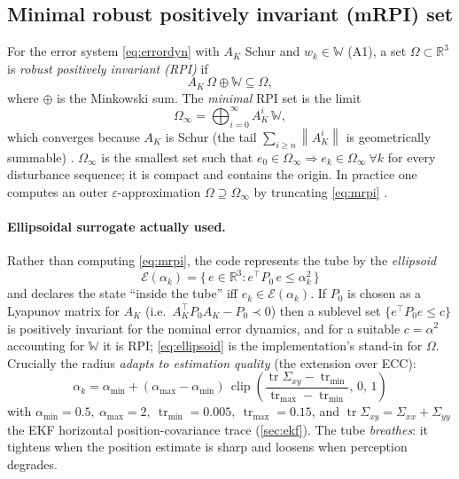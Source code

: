 \documentclass[11pt]{article}
\DeclareMathOperator{\tr}{tr}
\DeclareMathOperator{\clip}{clip}
\newcommand{\R}{\mathbb{R}}
\newcommand{\W}{\mathbb{W}}
\newcommand{\norm}[1]{\left\lVert #1 \right\rVert}
\begin{document}
\subsection{Minimal robust positively invariant (mRPI) set}
For the error system \cref{eq:errordyn} with $A_K$ Schur and $w_k\in\W$ (A1), a set $\Omega\subset\R^3$ is
\emph{robust positively invariant (RPI)} if
\begin{equation}
A_K\,\Omega \oplus \W \subseteq \Omega ,
\label{eq:rpi}
\end{equation}
where $\oplus$ is the Minkowski sum. The \emph{minimal} RPI set is the limit
\begin{equation}
\Omega_\infty = \bigoplus_{i=0}^{\infty} A_K^{i}\,\W ,
\label{eq:mrpi}
\end{equation}
which converges because $A_K$ is Schur (the tail $\sum_{i\ge n}\norm{A_K^i}$ is geometrically summable)
\citep{rakovic2005invariant}. $\Omega_\infty$ is the smallest set such that $e_0\in\Omega_\infty\Rightarrow
e_k\in\Omega_\infty\ \forall k$ for every disturbance sequence; it is compact and contains the origin. In
practice one computes an outer $\varepsilon$-approximation $\Omega\supseteq\Omega_\infty$ by truncating
\cref{eq:mrpi} \citep{rakovic2005invariant}.

\paragraph{Ellipsoidal surrogate actually used.} Rather than computing \cref{eq:mrpi}, the code represents the
tube by the \emph{ellipsoid}
\begin{equation}
\boxed{\;\mathcal{E}(\alpha_k) = \{\,e\in\R^3 : e^\top P_0\,e \le \alpha_k^2\,\}\;}
\label{eq:ellipsoid}
\end{equation}
and declares the state ``inside the tube'' iff $e_k\in\mathcal{E}(\alpha_k)$. If $P_0$ is chosen as a Lyapunov
matrix for $A_K$ (i.e.\ $A_K^\top P_0 A_K - P_0\prec 0$) then a sublevel set $\{e^\top P_0 e\le c\}$ is
positively invariant for the nominal error dynamics, and for a suitable $c=\alpha^2$ accounting for $\W$ it is
RPI; \cref{eq:ellipsoid} is the implementation's stand-in for $\Omega$. Crucially the radius
\emph{adapts to estimation quality} (the extension over ECC):
\begin{equation}
\boxed{\;\alpha_k = \alpha_{\min} + (\alpha_{\max}-\alpha_{\min})\,
\clip\!\left(\frac{\tr\Sigma_{xy}-\tr_{\min}}{\tr_{\max}-\tr_{\min}},\,0,\,1\right)\;}
\label{eq:alpha}
\end{equation}
with $\alpha_{\min}=0.5,\ \alpha_{\max}=2,\ \tr_{\min}=0.005,\ \tr_{\max}=0.15$, and $\tr\Sigma_{xy}=
\Sigma_{xx}+\Sigma_{yy}$ the EKF horizontal position-covariance trace (\cref{sec:ekf}). The tube
\emph{breathes}: it tightens when the position estimate is sharp and loosens when perception degrades.
\end{document}
